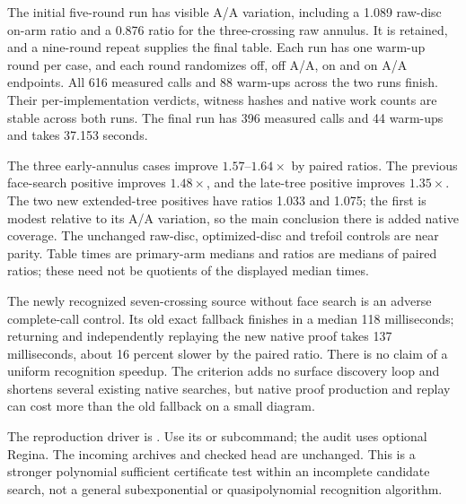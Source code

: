The initial five-round run has visible A/A variation, including a 1.089
raw-disc on-arm ratio and a 0.876 ratio for the three-crossing raw annulus.
It is retained, and a nine-round repeat supplies the final table. Each run
has one warm-up round per case, and each round randomizes off, off A/A,
on and on A/A endpoints. All 616 measured calls and 88 warm-ups across the
two runs finish. Their per-implementation verdicts, witness hashes and
native work counts are stable across both runs. The final run has 396
measured calls and 44 warm-ups and takes 37.153 seconds.

\begin{center}
\small
\end{center}

The three early-annulus cases improve $1.57$--$1.64\times$ by paired
ratios. The previous face-search positive improves $1.48\times$, and the
late-tree positive improves $1.35\times$. The two new extended-tree
positives have ratios 1.033 and 1.075; the first is modest relative to its
A/A variation, so the main conclusion there is added native coverage.
The unchanged raw-disc, optimized-disc and trefoil controls are near parity.
Table times are primary-arm medians and ratios are medians of paired
ratios; these need not be quotients of the displayed median times.

The newly recognized seven-crossing source without face search is an
adverse complete-call control. Its old exact fallback finishes in a median
118 milliseconds; returning and independently replaying the new native
proof takes 137 milliseconds, about 16 percent slower by the paired ratio.
There is no claim of a uniform recognition speedup. The criterion adds no
surface discovery loop and shortens several existing native searches, but
native proof production and replay can cost more than the old fallback on
a small diagram.

The reproduction driver is .
Use its  or  subcommand;
the audit uses optional Regina.
The incoming archives and checked  head
 are unchanged. This is a stronger polynomial sufficient
certificate test within an incomplete candidate search, not a general
subexponential or quasipolynomial recognition algorithm.
